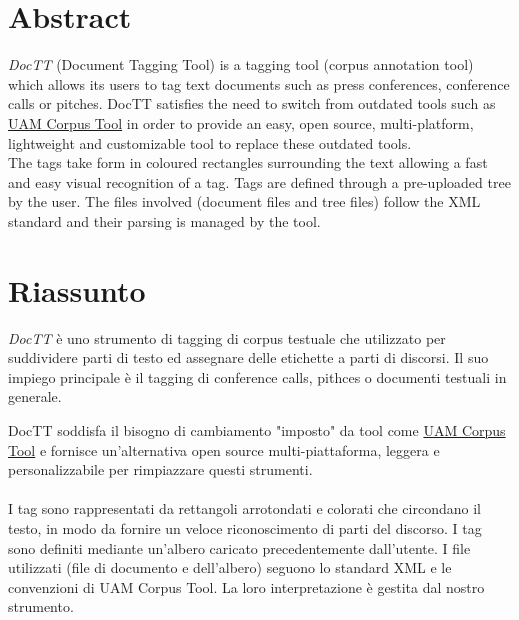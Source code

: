 \documentclass[twoside]{supsistudent}
\begin{document}
\maketitle
\onehalfspacing
\frontmatter


\tableofcontents
\listoffigures					%
\listoftables					%

\newpage
\mainmatter
{}
\setcounter{page}{1}

\chapter*{Abstract}
\textit{DocTT} (Document Tagging Tool) is a tagging tool (corpus annotation tool)
which allows its users to tag text documents such as press conferences,
conference calls or pitches.
DocTT satisfies the need to switch from outdated tools such as 
\href{http://www.corpustool.com/}{UAM Corpus Tool} in order to provide an easy, open source,
multi-platform, lightweight and customizable tool to replace these outdated tools. \\
The tags take form in coloured rectangles
surrounding the text allowing a fast and easy visual recognition of a tag.
Tags are defined through a pre-uploaded tree by the user. The files involved
(document files and tree files) follow the XML standard and their parsing is 
managed by the tool.

\chapter*{Riassunto}
\textit{DocTT} è uno strumento di tagging di corpus testuale che utilizzato per
suddividere parti di testo ed assegnare delle etichette a parti di discorsi.
Il suo impiego principale è il tagging di conference calls, pithces o documenti
testuali in generale.

DocTT soddisfa il bisogno di cambiamento "imposto" da tool come 
\href{http://www.corpustool.com/}{UAM Corpus Tool} e fornisce 
un'alternativa open source multi-piattaforma, leggera e personalizzabile
per rimpiazzare questi strumenti. \\
\\
I tag sono rappresentati da rettangoli arrotondati e colorati che
circondano il testo, in modo da fornire un veloce riconoscimento di parti del
discorso. I tag sono definiti mediante un'albero caricato precedentemente
dall'utente. I file utilizzati (file di documento e dell'albero) seguono
lo standard XML e le convenzioni di UAM Corpus Tool. La loro interpretazione
è gestita dal nostro strumento.
\end{document}
